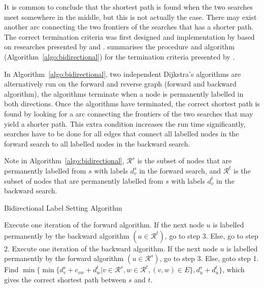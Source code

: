 It is common to conclude that the shortest path is found when the two searches meet somewhere in the middle,
but this is not actually the case.
There may exist another arc connecting the two frontiers of the searches that has a shorter path.
The correct termination criteria was first designed and implementation by \citet{Pohl} based on researches presented by \citet{Dantzig, Nicholson} and \citet{Dreyfus}.
\citet{Klunder} summarises the procedure and algorithm (Algorithm~\ref{algo:bidirectional}) for the termination criteria presented by \citet{Pohl}.

In Algorithm~\ref{algo:bidirectional},
two independent Dijkstra's algorithms are alternatively run on the forward  and reverse graph (forward and backward algorithm),
the algorithms terminate when a node is permanently labelled in both directions.
Once the algorithms have terminated,
the correct shortest path is found by looking for a arc connecting the frontiers of the two searches that may yield a shorter path.
This extra condition increases the run time significantly, 
searches have to be done for all edges that connect all labelled nodes in the forward search to all labelled nodes in the backward search.

Note in Algorithm~\ref{algo:bidirectional},
$\mathcal{R}^s$ is the subset of nodes that are permanently labelled from $s$ with labels $d_v^s$ in the forward search, and 
$\mathcal{R}^t$ is the subset of nodes that are permanently labelled from $s$ with labels $d_v^t$ in the backward search.

\begin{algorithm}[H]
    \caption{Bidirectional Label Setting Algorithm }
    \label{algo:bidirectional}
    \begin{algorithmic}[1]
        \State Execute one iteration of the forward algorithm.
        If the next node $u$ is labelled permanently by the 
        backward algorithm $(u\in\mathcal{R}^t)$, go to step 3.
        Else, go to step 2.
        \State Execute one iteration of the backward algorithm.
        If the next node $u$ is labelled permanently by the
        forward algorithm $(u\in\mathcal{R}^s)$, go to step 3.
        Else, goto step 1.
        \State Find $\min\{\min\{d_v^s + c_{vw} + d_w^t | v \in \mathcal{R}^s, w \in \mathcal{R}^t, (v, w) \in E\}, d_u^s + d_u^t\}$, which gives the correct shortest path between $s$ and $t$.
    \EndProcedure
\end{algorithmic}
\end{algorithm}

